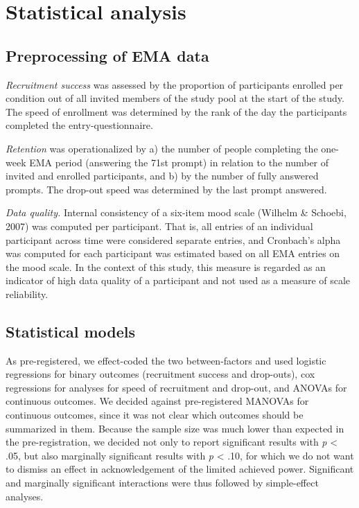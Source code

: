 \documentclass[authordate, empirical]{jote-new-article}
\begin{document}
	\section{Statistical analysis}



	\subsection{Preprocessing of EMA data}



	\emph{Recruitment success} was assessed by the proportion of participants enrolled per condition out of all invited members of the study pool at the start of the study. The speed of enrollment was determined by the rank of the day the participants completed the entry-questionnaire.



	\emph{Retention }was operationalized by a) the number of people completing the one-week EMA period (answering the 71st prompt) in relation to the number of invited and enrolled participants, and b) by the number of fully answered prompts. The drop-out speed was determined by the last prompt answered.



	\emph{Data quality. }Internal consistency of a six-item mood scale (Wilhelm \& Schoebi, 2007) was computed per participant. That is, all entries of an individual participant across time were considered separate entries, and Cronbach's alpha was computed for each participant was estimated based on all EMA entries on the mood scale. In the context of this study, this measure is regarded as an indicator of high data quality of a participant and not used as a measure of scale reliability.



	\subsection{Statistical models}



	As pre-registered, we effect-coded the two between-factors and used logistic regressions for binary outcomes (recruitment success and drop-outs), cox regressions for analyses for speed of recruitment and drop-out, and ANOVAs for continuous outcomes. We decided against pre-registered MANOVAs for continuous outcomes, since it was not clear which outcomes should be summarized in them. Because the sample size was much lower than expected in the pre-registration, we decided not only to report significant results with \emph{p} < .05, but also marginally significant results with \emph{p} < .10, for which we do not want to dismiss an effect in acknowledgement of the limited achieved power. Significant and marginally significant interactions were thus followed by simple-effect analyses.
\end{document}
